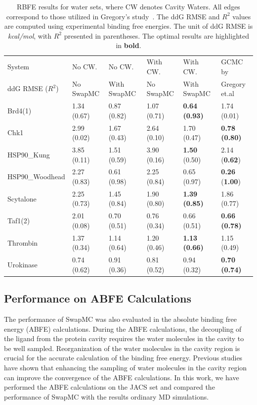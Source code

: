 \documentclass[journal=jacsat,manuscript=article]{achemso}
\begin{document}
\begin{table}
  \caption{RBFE results for water sets, where CW denotes Cavity Waters. All edges correspond to those utilized in Gregory's study~\cite{ross2020enhancing}. 
  The ddG RMSE and $R^2$ values are computed using experimental binding free energies. 
  The unit of ddG RMSE is \textit{kcal/mol}, with $R^2$ presented in parentheses. 
  The optimal results are highlighted in \textbf{bold}.}
  \label{tbl:rbfe_watersets}
  \begin{tabular}{l|lllll}
    \hline
    System                    & No CW.     & No CW.        & With CW.    & With CW.     & GCMC by  \\
    ddG RMSE ($R^2$)          & No SwapMC  & With SwapMC   & No SwapMC   & With SwapMC  & Gregory et.al~\cite{ross2020enhancing} \\
    \hline
    Brd4(1)                      & 1.34 (0.67) & 0.87 (0.82) & 1.07 (0.71) & \textbf{0.64 (0.93)} & 1.74 (0.01) \\
    Chk1                         & 2.99 (0.02) & 1.67 (0.43) & 2.64 (0.10) & 1.70 (0.47) & \textbf{0.78 (0.80)} \\
    HSP90\_Kung                  & 3.85 (0.11) & 1.51 (0.59) & 3.90 (0.16) & \textbf{1.50} (0.50) & 2.14 (\textbf{0.62}) \\
    HSP90\_Woodhead              & 2.27 (0.83) & 0.61 (0.98) & 2.25 (0.84) & 0.65 (0.97) & \textbf{0.26} (\textbf{1.00}) \\
    Scytalone                    & 2.25 (0.73) & 1.45 (0.84) & 1.90 (0.80) & \textbf{1.39 (0.85)} & 1.86 (0.77) \\
    Taf1(2)                      & 2.01 (0.08) & 0.70 (0.51) & 0.76 (0.34) & 0.66 (0.51) & \textbf{0.66 (0.78)} \\
    Thrombin                     & 1.37 (0.34) & 1.14 (0.64) & 1.20 (0.46) & \textbf{1.13 (0.66)} & 1.15 (0.49) \\
    Urokinase                    & 0.74 (0.62) & 0.91 (0.36) & 0.81 (0.52) & 0.94 (0.32) & \textbf{0.70 (0.74)} \\
    \hline
  \end{tabular}
\end{table}

\subsection{Performance on ABFE Calculations}
The performance of SwapMC was also evaluated in the absolute binding free energy (ABFE) calculations.
During the ABFE calculations, the decoupling of the ligand from the protein cavity requires the water molecules in the cavity to be well sampled.
Reorganization of the water molecules in the cavity region is crucial for the accurate calculation of the binding free energy.
Previous studies~\cite{Liu2025} have shown that enhancing the sampling of water molecules in the cavity region can improve the convergence of the ABFE calculations.
In this work, we have performed the ABFE calculations on the JACS set and compared the performance of SwapMC with the results ordinary MD simulations.
\end{document}
